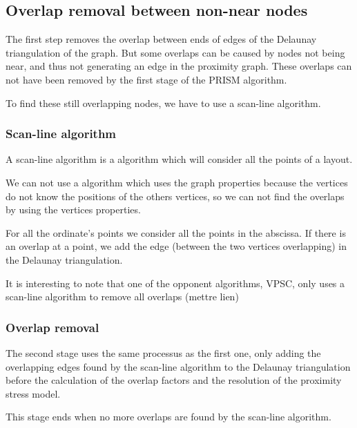 \documentclass[12pt]{report}
\begin{document}
\subsection{Overlap removal between non-near nodes}

The first step removes the overlap between ends of edges of the Delaunay triangulation of the graph. But some overlaps can be caused by nodes not being near, and thus not generating an edge in the proximity graph. These overlaps can not have been removed by the first stage of the PRISM algorithm.

To find these still overlapping nodes, we have to use a scan-line algorithm.
\subsubsection{Scan-line algorithm}

A scan-line algorithm is a algorithm which will consider all the points of a layout.

We can not use a algorithm which uses the graph properties because the vertices do not know the positions of the others vertices, so we can not find the overlaps by using the vertices properties.

For all the ordinate's points we consider all the points in the abscissa. If there is an overlap at a point, we add the edge (between the two vertices overlapping) in the Delaunay triangulation. 


\bigskip
It is interesting to note that one of the opponent algorithms, VPSC, only uses a scan-line algorithm to remove all overlaps (mettre lien)

\subsubsection{Overlap removal}

The second stage uses the same processus as the first one, only adding the overlapping edges found by the scan-line algorithm to the Delaunay triangulation before the calculation of the overlap factors and the resolution of the proximity stress model.

This stage ends when no more overlaps are found by the scan-line algorithm.
\end{document}
